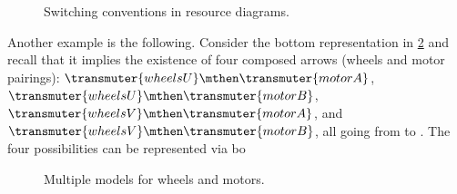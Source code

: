 \begin{figure}[h!]
\begin{center}
\end{center}
\caption{Switching conventions in resource diagrams.}
  \label{fig:isodiagrams_2}
\end{figure}

Another example is the following. Consider the bottom representation in \cref{fig:e4combination} and recall that it implies the existence of four composed arrows (wheels and motor pairings):  $\transmuter{wheels U}\mthen  \transmuter{motor A}$,~$\transmuter{wheels U} \mthen \transmuter{motor B}$,~$\transmuter{wheels V} \mthen \transmuter{motor A}$, and~$\transmuter{wheels V} \mthen \transmuter{motor B}$, all going from \translationalmotion to \electricpower. The four possibilities can be represented via bo

\begin{figure}[h!]
  \centering
  \caption{Multiple models for wheels and motors.}
   \label{fig:e4combination}
\end{figure}





\clearpage






%
%
%
%
